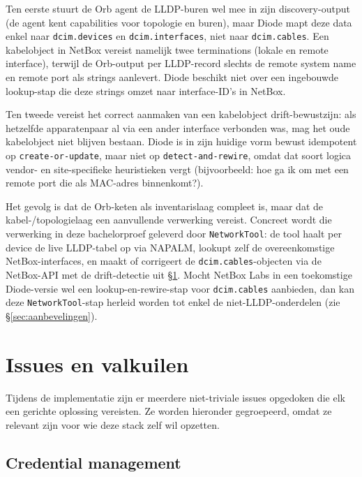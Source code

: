 Ten eerste stuurt de Orb agent de LLDP-buren wel mee in zijn discovery-output (de agent kent capabilities voor topologie en buren), maar Diode mapt deze data enkel naar \texttt{dcim.devices} en \texttt{dcim.interfaces}, niet naar \texttt{dcim.cables}. Een kabelobject in NetBox vereist namelijk twee terminations (lokale en remote interface), terwijl de Orb-output per LLDP-record slechts de remote system name en remote port als strings aanlevert. Diode beschikt niet over een ingebouwde lookup-stap die deze strings omzet naar interface-ID's in NetBox.

Ten tweede vereist het correct aanmaken van een kabelobject drift-bewustzijn: als hetzelfde apparatenpaar al via een ander interface verbonden was, mag het oude kabelobject niet blijven bestaan. Diode is in zijn huidige vorm bewust idempotent op \texttt{create-or-update}, maar niet op \texttt{detect-and-rewire}, omdat dat soort logica vendor- en site-specifieke heuristieken vergt (bijvoorbeeld: hoe ga ik om met een remote port die als MAC-adres binnenkomt?).

Het gevolg is dat de Orb-keten als inventarislaag compleet is, maar dat de kabel-/topologielaag een aanvullende verwerking vereist. Concreet wordt die verwerking in deze bachelorproef geleverd door \texttt{NetworkTool}: de tool haalt per device de live LLDP-tabel op via NAPALM\autocite{NAPALM}, lookupt zelf de overeenkomstige NetBox-interfaces, en maakt of corrigeert de \texttt{dcim.cables}-objecten via de NetBox-API met de drift-detectie uit \S\ref{sec:issues-valkuilen}. Mocht NetBox Labs in een toekomstige Diode-versie wel een lookup-en-rewire-stap voor \texttt{dcim.cables} aanbieden, dan kan deze \texttt{NetworkTool}-stap herleid worden tot enkel de niet-LLDP-onderdelen (zie \S\ref{sec:aanbevelingen}).

\section{Issues en valkuilen}
\label{sec:issues-valkuilen}

Tijdens de implementatie zijn er meerdere niet-triviale issues opgedoken die elk een gerichte oplossing vereisten. Ze worden hieronder gegroepeerd, omdat ze relevant zijn voor wie deze stack zelf wil opzetten.

\subsection{Credential management}

